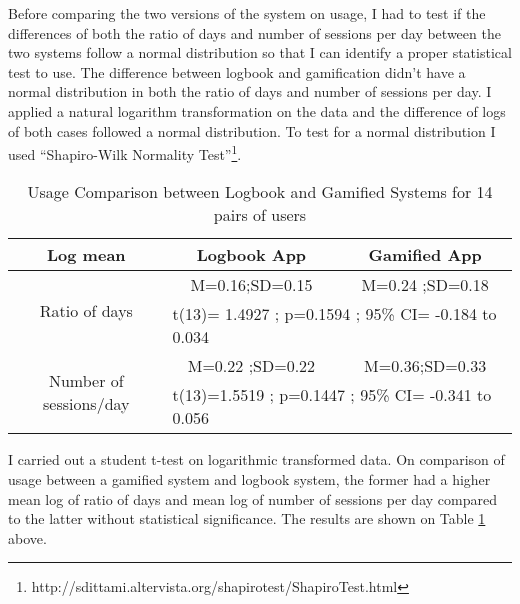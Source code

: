 Before comparing the two versions of the system on usage, I had to test if the differences of both the ratio of days and number of sessions per day between the two systems follow a normal distribution so that I can identify a proper statistical test to use. The difference between logbook and gamification didn't have a normal distribution in both the ratio of days and number of sessions per day. I applied a natural logarithm transformation on the data and the difference of logs of both cases followed a normal distribution. To test for a normal distribution I used ``Shapiro-Wilk Normality Test''\footnote{http://sdittami.altervista.org/shapirotest/ShapiroTest.html}.
\newline 
\begin{table}[h!]
  \begin{center}
    \caption{Usage Comparison between Logbook and Gamified Systems for 14 pairs of users}
    \label{table:usagewellness1}
	\begin{tabular}{|c|c|c|}
		\hline
		Log mean &Logbook App&Gamified App\\
		\hline
		 \multirow{2}{*}{Ratio of days}&M=0.16;SD=0.15&M=0.24 ;SD=0.18\\\cline{2-3} 

		 &\multicolumn{2}{|l|}{t(13)= 1.4927 ; p=0.1594 ; 95\% CI= -0.184 to 0.034} \\
\hline
   		 \multirow{2}{*}{ Number of sessions/day}&M=0.22 ;SD=0.22&M=0.36;SD=0.33\\\cline{2-3} 
		
		 &\multicolumn{2}{|l|}{t(13)=1.5519 ; p=0.1447 ; 95\% CI= -0.341 to 0.056} \\
\hline
	\end{tabular}
  \end{center}
\end{table}
\newline  
 
I carried out a student t-test on logarithmic transformed data.  On comparison of usage between a gamified system and logbook system, the former had a higher mean log of ratio of days  and mean log of number of sessions per day compared to the latter without statistical significance.
The results are shown on Table \ref{table:usagewellness1} above.

